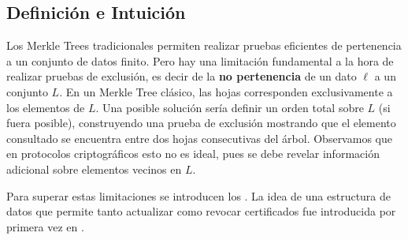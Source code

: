 
\subsection{Definición e Intuición}
\label{subsec:apendice-a-sparse-merkle-tree-definicion-e-intuicion}

Los Merkle Trees tradicionales permiten realizar pruebas eficientes de pertenencia a un conjunto de datos finito. Pero hay una limitación fundamental a la hora de realizar pruebas de exclusión, es decir de la \textbf{no pertenencia} de un dato $\ell$ a un conjunto $L$. En un Merkle Tree clásico, las hojas corresponden exclusivamente a los elementos de $L$. Una posible solución sería definir un orden total sobre $L$ (si fuera posible), construyendo una prueba de exclusión mostrando que el elemento consultado se encuentra entre dos hojas consecutivas del árbol. Observamos que en protocolos criptográficos esto no es ideal, pues se debe revelar información adicional sobre elementos vecinos en $L$.

Para superar estas limitaciones se introducen los \SMT. La idea de una estructura de datos que permite tanto actualizar como revocar certificados fue introducida por primera vez en \cite{Naor2000}.

